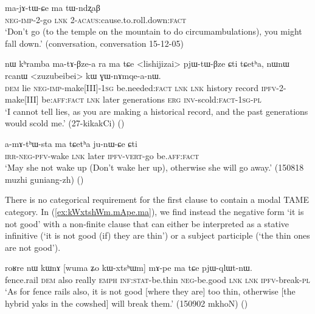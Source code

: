 \begin{exe}
\ex \label{ex:ma.tWndzxaB}
\gll  ma-jɤ-tɯ-ɕe ma tɯ-ndʐaβ \\
\textsc{neg}-\textsc{imp}-2-go \textsc{lnk} 2-\textsc{acaus}:cause.to.roll.down:\textsc{fact} \\
\glt `Don't go (to the temple on the mountain to do circumambulations), you might fall down.' (conversation, conversation 15-12-05)
\end{exe}

\begin{exe}
\ex \label{ex:matABzea}
\gll nɯ kʰramba ma-tɤ-βze-a ra ma tɕe <lishijizai> pjɯ-tɯ-βze ɕti tɕetʰa, nɯnɯ rcanɯ <zuzubeibei> kɯ ɣɯ-nɤmqe-a-nɯ.  \\
\textsc{dem}  lie \textsc{neg}-\textsc{imp}-make[III]-\textsc{1sg} be.needed:\textsc{fact} \textsc{lnk} \textsc{lnk}   history record \textsc{ipfv}-2-make[III] be:\textsc{aff}:\textsc{fact} \textsc{lnk} later generations \textsc{erg}  \textsc{inv}-scold:\textsc{fact}-\textsc{1sg}-\textsc{pl} \\
\glt `I cannot tell lies, as you are making a historical record, and the past generations would scold me.'  (27-kikakCi)
()
 \end{exe}

\begin{exe}
\ex \label{ex:ma.tCetha.junWCe}
\gll a-mɤ-tʰɯ-sta ma tɕetʰa ju-nɯ-ɕe ɕti \\
\textsc{irr}-\textsc{neg}-\textsc{pfv}-wake \textsc{lnk} later \textsc{ipfv}-\textsc{vert}-go be.\textsc{aff}:\textsc{fact} \\
\glt `May she not wake up (Don't wake her up), otherwise she will go away.' (150818 muzhi guniang-zh)
()
\end{exe}  

There is no categorical requirement for the first clause to contain a modal TAME category. In (\ref{ex:kWxtshWm.mApe.ma}), we find instead the negative form  `it is not good' with a non-finite clause that can either be interpreted as a stative infinitive (`it is not good (if) they are thin') or a subject participle (`the thin ones are not good').

\begin{exe}
\ex \label{ex:kWxtshWm.mApe.ma}
\gll roʁre nɯ kɯnɤ [wuma ʑo kɯ-xtsʰɯm] mɤ-pe ma tɕe pjɯ-qlɯt-nɯ. \\
fence.rail \textsc{dem} also really \textsc{emph} \textsc{inf}:\textsc{stat}-be.thin \textsc{neg}-be.good \textsc{lnk} \textsc{lnk} \textsc{ipfv}-break-\textsc{pl} \\
\glt `As for fence rails also, it is not good [where they are] too thin, otherwise [the hybrid yaks in the cowshed] will break them.' (150902 mkhoN)
()
\end{exe}  

